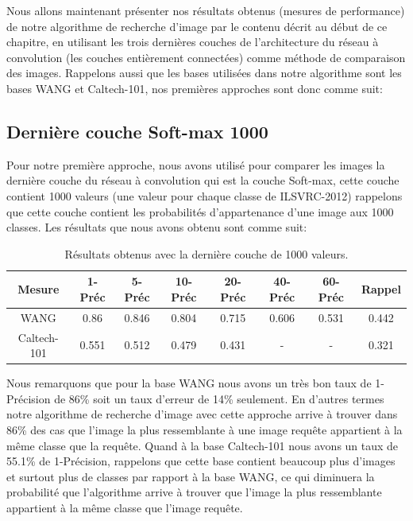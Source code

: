 	Nous allons maintenant présenter nos résultats obtenus (mesures de performance) de notre algorithme de recherche d'image par le contenu décrit au début de ce chapitre, en utilisant les trois dernières couches de l'architecture du réseau à convolution (les couches entièrement connectées) comme méthode de comparaison des images. Rappelons aussi que les bases utilisées dans notre algorithme sont les bases WANG et Caltech-101, nos premières approches sont donc comme suit:

\subsection{Dernière couche Soft-max 1000}
	Pour notre première approche, nous avons utilisé pour comparer les images la dernière couche du réseau à convolution qui est la couche Soft-max, cette couche contient 1000 valeurs (une valeur pour chaque classe de ILSVRC-2012) rappelons que cette couche contient les probabilités d'appartenance d'une image aux 1000 classes. Les résultats que nous avons obtenu sont comme suit:

\begin{table}[H]
\begin{center}
\begin{tabular}{|c|c|c|c|c|c|c|c|}
\hline
	Mesure & 1-Préc & 5-Préc & 10-Préc & 20-Préc & 40-Préc & 60-Préc & Rappel\\
\hline
	WANG & 0.86 & 0.846 & 0.804 & 0.715 & 0.606 & 0.531 & 0.442\\
\hline
	Caltech-101 & 0.551 & 0.512 & 0.479 & 0.431 & - & - & 0.321\\
\hline
\end{tabular}
\end{center}
\caption{Résultats obtenus avec la dernière couche de 1000 valeurs.}
\end{table}

	Nous remarquons que pour la base WANG nous avons un très bon taux de 1-Précision de 86\% soit un taux d'erreur de 14\% seulement. En d'autres termes notre algorithme de recherche d'image avec cette approche arrive à trouver dans 86\% des cas que l'image la plus ressemblante à une image requête appartient à la même classe que la requête. Quand à la base Caltech-101 nous avons un taux de 55.1\% de 1-Précision, rappelons que cette base contient beaucoup plus d'images et surtout plus de classes par rapport à la base WANG, ce qui diminuera la probabilité que l'algorithme arrive à trouver que l'image la plus ressemblante appartient à la même classe que l'image requête.
	
